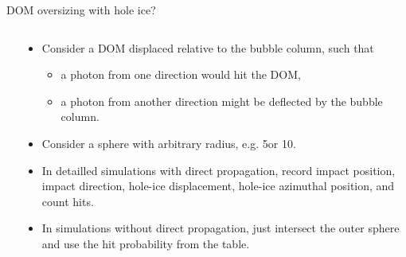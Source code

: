 
\begin{frame}[fragile]{DOM oversizing with hole ice?}

  \begin{columns}
    \begin{column}{0.5\textwidth}
      \begin{overlayarea}{\textwidth}{\textheight}
        \vspace*{2cm}
      \end{overlayarea}
    \end{column}
    \begin{column}{0.5\textwidth}
      \begin{itemize}
        \item Consider a DOM displaced relative to the bubble column, such that
        \begin{itemize}
          \item a photon from one direction would hit the DOM,
          \item<2-> a photon from another direction might be deflected by the bubble column.
        \end{itemize}
        \item<3-> Consider a sphere with arbitrary radius, e.g. 5\m or 10\m.
        \item<4-> In detailled simulations with direct propagation, record impact position, impact direction, hole-ice displacement, hole-ice azimuthal position, and count hits.
        \item<5> In simulations without direct propagation, just intersect the outer sphere and use the hit probability from the table.
      \end{itemize}
    \end{column}
  \end{columns}

\end{frame}